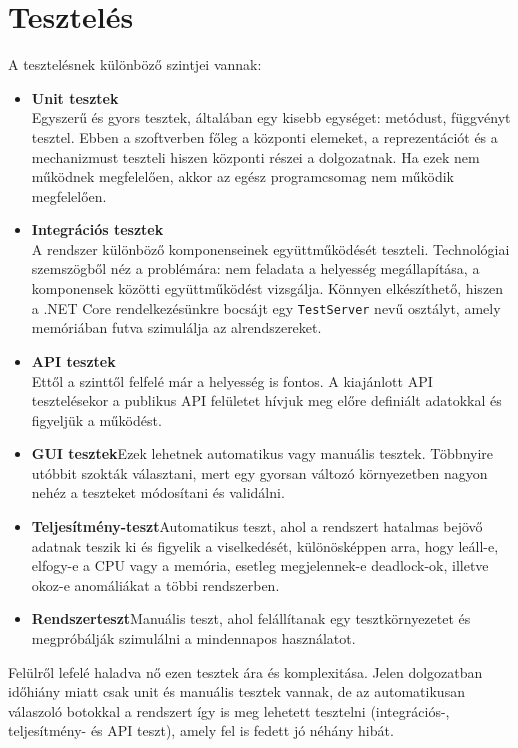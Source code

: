 \documentclass[twoside, a4paper, 12pt]{book}
\begin{document}
\chapter{Tesztelés}
A tesztelésnek különböző szintjei vannak:
\begin{itemize}
	\item \textbf{Unit tesztek} \\
	Egyszerű és gyors tesztek, általában egy kisebb egységet: metódust, függvényt tesztel. Ebben a szoftverben főleg a központi elemeket, a reprezentációt és a mechanizmust teszteli hiszen központi részei a dolgozatnak. Ha ezek nem működnek megfelelően, akkor az egész programcsomag nem működik megfelelően.
	
	\item \textbf{Integrációs tesztek} \\
	A rendszer különböző komponenseinek együttműködését teszteli. Technológiai szemszögből néz a problémára: nem feladata a helyesség megállapítása, a komponensek közötti együttműködést vizsgálja. Könnyen elkészíthető, hiszen a .NET Core rendelkezésünkre bocsájt egy \texttt{TestServer} nevű osztályt, amely memóriában futva szimulálja az alrendszereket.
	
	\item \textbf{API tesztek} \\
	Ettől a szinttől felfelé már a helyesség is fontos. A kiajánlott API tesztelésekor a publikus API felületet hívjuk meg előre definiált adatokkal és figyeljük a működést.
	
	\item \textbf{GUI tesztek}Ezek lehetnek automatikus vagy manuális tesztek. Többnyire utóbbit szokták választani, mert egy gyorsan változó környezetben nagyon nehéz a teszteket módosítani és validálni.
	
	\item \textbf{Teljesítmény-teszt}Automatikus teszt, ahol a rendszert hatalmas bejövő adatnak teszik ki és figyelik a viselkedését, különösképpen arra, hogy leáll-e, elfogy-e a CPU vagy a memória, esetleg megjelennek-e deadlock-ok, illetve okoz-e anomáliákat a többi rendszerben.
	
	\item \textbf{Rendszerteszt}Manuális teszt, ahol felállítanak egy tesztkörnyezetet és megpróbálják szimulálni a mindennapos használatot.
	
\end{itemize}

Felülről lefelé haladva nő ezen tesztek ára és komplexitása. Jelen dolgozatban időhiány miatt csak unit és manuális tesztek vannak, de az automatikusan válaszoló botokkal a rendszert így is meg lehetett tesztelni (integrációs-, teljesítmény- és API teszt), amely fel is fedett jó néhány hibát.
\end{document}
